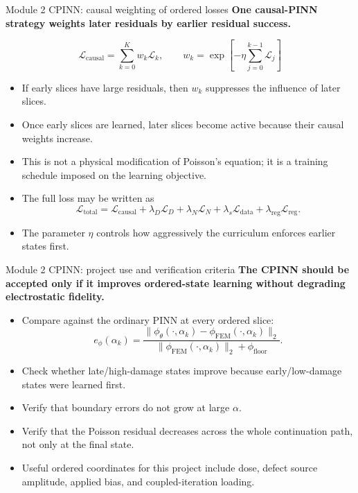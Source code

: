 \documentclass[aspectratio=169,10pt]{beamer}
\begin{document}
\begin{frame}{Module 2 CPINN: causal weighting of ordered losses}
\footnotesize
\textbf{One causal-PINN strategy weights later residuals by earlier residual success.}

\vspace{-0.2em}
\begin{equation*}
\boxed{
\mathcal L_{\mathrm{causal}}
=\sum_{k=0}^{K} w_k\mathcal L_k,
\qquad
w_k=\exp\left[-\eta\sum_{j=0}^{k-1}\mathcal L_j\right]
}
\end{equation*}

\vspace{-0.15em}
\begin{itemize}
    \item If early slices have large residuals, then $w_k$ suppresses the influence of later slices.
    \item Once early slices are learned, later slices become active because their causal weights increase.
    \item This is not a physical modification of Poisson's equation; it is a training schedule imposed on the learning objective.
    \item The full loss may be written as
    \[
        \mathcal L_{\mathrm{total}}
        =\mathcal L_{\mathrm{causal}}
        +\lambda_D\mathcal L_D
        +\lambda_N\mathcal L_N
        +\lambda_s\mathcal L_{\mathrm{data}}
        +\lambda_{\mathrm{reg}}\mathcal L_{\mathrm{reg}}.
    \]
    \item The parameter $\eta$ controls how aggressively the curriculum enforces earlier states first.
\end{itemize}
\end{frame}

\begin{frame}{Module 2 CPINN: project use and verification criteria}
\small
\textbf{The CPINN should be accepted only if it improves ordered-state learning without degrading electrostatic fidelity.}

\vspace{-0.1em}
\begin{itemize}
    \item Compare against the ordinary PINN at every ordered slice:
    \[
        e_{\phi}(\alpha_k)=
        \frac{\|\phi_{\theta}(\cdot,\alpha_k)-\phi_{\mathrm{FEM}}(\cdot,\alpha_k)\|_2}
        {\|\phi_{\mathrm{FEM}}(\cdot,\alpha_k)\|_2+\phi_{\mathrm{floor}}}.
    \]
    \item Check whether late/high-damage states improve because early/low-damage states were learned first.
    \item Verify that boundary errors do not grow at large $\alpha$.
    \item Verify that the Poisson residual decreases across the whole continuation path, not only at the final state.
    \item Useful ordered coordinates for this project include dose, defect source amplitude, applied bias, and coupled-iteration loading.
\end{itemize}
\end{frame}
\end{document}
